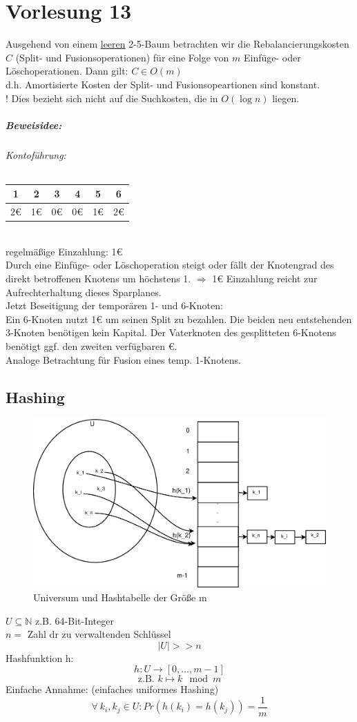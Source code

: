 \chapter{Vorlesung 13}
\satz Ausgehend von einem \underline{leeren} 2-5-Baum betrachten wir die Rebalancierungskosten $C$ (Split- und Fusionsoperationen) für eine Folge von $m$ Einfüge- oder Löschoperationen. Dann gilt: $C\in O(m)$\\
d.h. Amortisierte Kosten der Split- und Fusionsopeartionen sind konstant.\\
! Dies bezieht sich nicht auf die Suchkosten, die in $O(\log n)$ liegen.
\paragraph*{Beweisidee:}
\subparagraph*{Kontoführung:}
\begin{tabular}{|c|c|c|c|c|c|}
	\hline \rule[-2ex]{0pt}{5.5ex} 1 & 2 & 3 & 4 & 5 & 6 \\ 
	\hline \rule[-2ex]{0pt}{5.5ex} 2€ & 1€ & 0€ & 0€ & 1€ & 2€ \\ 
	\hline 
\end{tabular} \\
regelmäßige Einzahlung: 1€\\
Durch eine Einfüge- oder Löschoperation steigt oder fällt der Knotengrad des direkt betroffenen Knotens um höchstens 1. $\Rightarrow$ 1€ Einzahlung reicht zur Aufrechterhaltung dieses Sparplanes.\\
Jetzt Beseitigung der temporären 1- und 6-Knoten:\\
Ein 6-Knoten nutzt 1€ um seinen Split zu bezahlen. Die beiden neu entstehenden 3-Knoten benötigen kein Kapital. Der Vaterknoten des gesplitteten 6-Knotens benötigt ggf. den zweiten verfügbaren €.\\
Analoge Betrachtung für Fusion eines temp. 1-Knotens.
\section{Hashing}
\begin{figure}[h]
\centering
\caption[Universum und Hashtabelle der Größe m]{Universum und Hashtabelle der Größe m}
\label{fig:hashing}
\includegraphics[width=0.8\linewidth]{13/Grafik/hashing}
\end{figure}
$U \subseteq \mathbb{N}$ z.B. 64-Bit-Integer\\
$n=$ Zahl dr zu verwaltenden Schlüssel\\
\[|U| >> n\]
Hashfunktion h:
\[h: U\rightarrow[0,\ldots,m-1]\]
\[\text{z.B. }k\mapsto k \mod m \]
Einfache Annahme: (einfaches uniformes Hashing)
\[\forall~k_i,k_j \in U : Pr(h(k_i)=h(k_j))=\frac{1}{m}   \]
